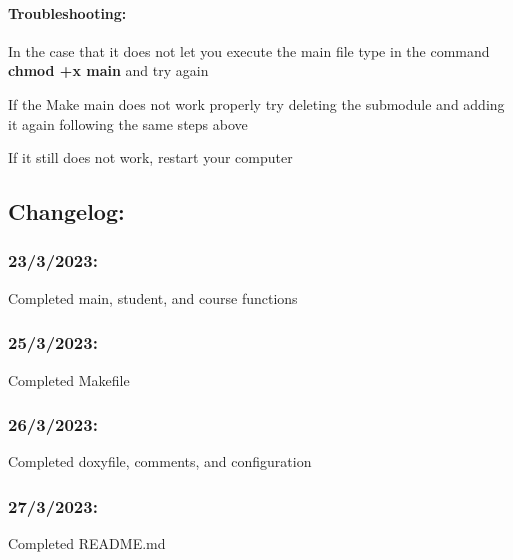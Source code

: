 \paragraph*{Troubleshooting\+:}


\begin{DoxyItemize}
\item In the case that it does not let you execute the main file type in the command {\bfseries chmod +x main} and try again
\item If the Make main does not work properly try deleting the submodule and adding it again following the same steps above
\item If it still does not work, restart your computer
\end{DoxyItemize}

\subsection*{Changelog\+:}

\subsubsection*{23/3/2023\+:}

Completed main, student, and course functions

\subsubsection*{25/3/2023\+:}

Completed Makefile

\subsubsection*{26/3/2023\+:}

Completed doxyfile, comments, and configuration

\subsubsection*{27/3/2023\+:}

Completed R\+E\+A\+D\+M\+E.\+md 